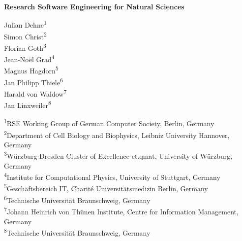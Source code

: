 

\newcommand{\orcidicon}[1]{%
    \href{https://orcid.org/#1}{\textcolor[HTML]{A6CE39}{\aiOrcid}}%
}

\begin{titlepage}
    \onecolumn
    \centering
    \vspace*{2cm}

    {\LARGE\bfseries Research Software Engineering for Natural Sciences\par}

    \vspace{1.5cm}

    {\large
    Julian Dehne\textsuperscript{1}\;\orcidicon{0000-0001-9265-9619}\\
    Simon Christ\textsuperscript{2}\;\orcidicon{0000-0002-5866-1472}\\
    Florian Goth\textsuperscript{3}\;\orcidicon{0000-0003-2707-4790}\\
    Jean-Noël Grad\textsuperscript{4}\;\orcidicon{0000-0002-5821-4912}\\
    Magnus Hagdorn\textsuperscript{5}\;\orcidicon{0000-0002-5076-4864}\\
    Jan Philipp Thiele\textsuperscript{6}\;\orcidicon{0000-0002-2755-5087}\\
    Harald von Waldow\textsuperscript{7}\;\orcidicon{0000-0003-4800-2833}\\
    Jan Linxweiler\textsuperscript{8}\;\orcidicon{0000-0002-2755-5087}\\
    }

    \vspace{1.0cm}

    {\small
    \textsuperscript{1}\;RSE Working Group of German Computer Society, Berlin, Germany\\
    \textsuperscript{2}\;Department of Cell Biology and Biophysics, Leibniz University Hannover, Germany\\
    \textsuperscript{3}\;Würzburg-Dresden Cluster of Excellence ct.qmat, University of Würzburg, Germany\\
    \textsuperscript{4}\;Institute for Computational Physics, University of Stuttgart, Germany\\
    \textsuperscript{5}\;Geschäftsbereich IT, Charité Universitätsmedizin Berlin, Germany\\
    \textsuperscript{6}\;Technische Universität Braunschweig, Germany\\
    \textsuperscript{7}\;Johann Heinrich von Thünen Institute, Centre for Information Management, Germany\\
    \textsuperscript{8}\;Technische Universität Braunschweig, Germany\\
    }


\end{titlepage}

